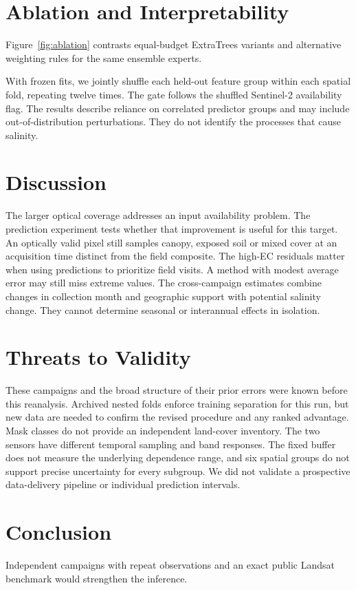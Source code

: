 \documentclass[conference]{IEEEtran}
\begin{document}
\section{Ablation and Interpretability}
Figure~\ref{fig:ablation} contrasts equal-budget ExtraTrees variants and alternative weighting rules for the same ensemble experts. \AblationText{} \HighWeightText{}

With frozen fits, we jointly shuffle each held-out feature group within each spatial fold, repeating twelve times. The gate follows the shuffled Sentinel-2 availability flag. \ImportanceText{} The results describe reliance on correlated predictor groups and may include out-of-distribution perturbations. They do not identify the processes that cause salinity.

\section{Discussion}
The larger optical coverage addresses an input availability problem. The prediction experiment tests whether that improvement is useful for this target. An optically valid pixel still samples canopy, exposed soil or mixed cover at an acquisition time distinct from the field composite. The high-EC residuals matter when using predictions to prioritize field visits. A method with modest average error may still miss extreme values. The cross-campaign estimates combine changes in collection month and geographic support with potential salinity change. They cannot determine seasonal or interannual effects in isolation.

\section{Threats to Validity}
These campaigns and the broad structure of their prior errors were known before this reanalysis. Archived nested folds enforce training separation for this run, but new data are needed to confirm the revised procedure and any ranked advantage. Mask classes do not provide an independent land-cover inventory. The two sensors have different temporal sampling and band responses. The fixed buffer does not measure the underlying dependence range, and six spatial groups do not support precise uncertainty for every subgroup. We did not validate a prospective data-delivery pipeline or individual prediction intervals.

\section{Conclusion}
\ConclusionText{} Independent campaigns with repeat observations and an exact public Landsat benchmark would strengthen the inference.
\end{document}
